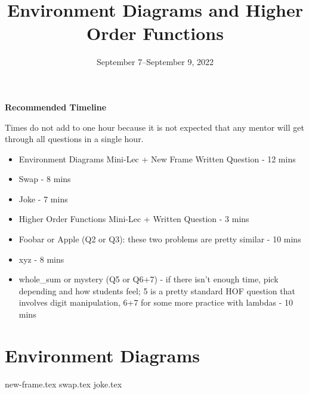 \documentclass{exam}
\title{Environment Diagrams \titlebreak and Higher Order Functions}
\date{September 7--September 9, 2022}
\begin{document}
\maketitle

\begin{blocksection}
\begin{guide}
\textbf{Recommended Timeline}

Times do not add to one hour because it is not expected that any mentor will get through all questions in a single hour. 

\begin{itemize}
    \item Environment Diagrams Mini-Lec + New Frame Written Question - 12 mins
    \item Swap - 8 mins
    \item Joke - 7 mins
    \item Higher Order Functions Mini-Lec + Written Question - 3 mins
    \item Foobar or Apple (Q2 or Q3): these two problems are pretty similar - 10 mins
    \item xyz - 8 mins
    \item whole\_sum or mystery (Q5 or Q6+7) - if there isn't enough time, pick depending and how students feel;
    5 is a pretty standard HOF question that involves digit manipulation, 6+7 for some more practice with lambdas - 10 mins
\end{itemize}
\end{guide}
\end{blocksection}


\section{Environment Diagrams}

\begin{questions}
{new-frame.tex}
{swap.tex}
{joke.tex}
\end{questions}
\end{document}
